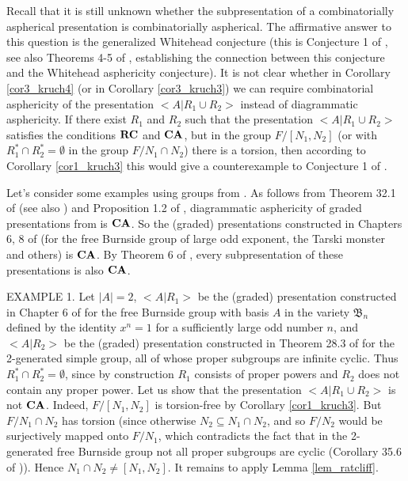 \documentclass[12pt,reqno]{amsart}
\begin{document}
Recall that it is still unknown whether the subpresentation of a combinatorially aspherical presentation is combinatorially aspherical. The affirmative answer to this question is the generalized Whitehead conjecture (this is Conjecture 1 of \cite{ivanov}, see also Theorems 4-5 of \cite{ivanov}, establishing the connection between this conjecture and the Whitehead asphericity conjecture).
   It is not clear whether in Corollary \ref{cor3_kruch4} (or in Corollary \ref{cor3_kruch3}) we can require combinatorial asphericity of the presentation $<A|R_1\cup R_2>$ instead of diagrammatic asphericity.
      If there exist $R_1$ and $R_2$ such that the presentation $<A|R_1\cup R_2>$ satisfies the conditions $\bf RC$ and $\bf CA$, but in the group $F/[N_1, N_2]$ (or with $R_1^*\cap R_2^*=\emptyset$ in the group $F/N_1\cap N_2$) there is a torsion, then according to Corollary \ref{cor1_kruch3} this would give a counterexample to Conjecture 1 of \cite{ivanov}.

   Let's consider some examples using  groups from \cite{olsh}. As follows from Theorem 32.1 of \cite{olsh} (see also \cite{ashmanovOlsh}) and Proposition 1.2 of \cite{chiswell},  diagrammatic asphericity of graded presentations from \cite{olsh} is $\bf CA$. So the (graded) presentations constructed in Chapters 6, 8 of \cite{olsh} (for the free Burnside group of large odd exponent, the Tarski monster and others) is $\bf CA$. By Theorem 6 of \cite{ivanov}, every subpresentation of these presentations is also $\bf CA$.


    EXAMPLE 1. Let $|A|=2$, $<A|R_1>$ be the (graded) presentation constructed in Chapter 6 of \cite{olsh} for the free Burnside group with basis $A$ in the variety $\mathfrak{B}_n$ defined by the identity $x^n=1$ for a sufficiently large odd number $n$, and $<A|R_2>$ be the (graded) presentation constructed in Theorem 28.3 of \cite{olsh} for  the 2-generated simple group, all of whose  proper subgroups are infinite cyclic. Thus $R_1^*\cap R_2^*=\emptyset$, since by construction $R_1$ consists of proper powers and $R_2$ does not contain any proper power. Let us show that the presentation $<A|R_1\cup R_2>$ is not $\bf CA$.  Indeed,  $F/[N_1, N_2]$ is torsion-free by Corollary \ref{cor1_kruch3}. But  $F/N_1\cap N_2$ has torsion (since   otherwise
   $N_2\subseteq N_1\cap N_2$, and so $F/N_2$ would be surjectively mapped onto $F/N_1$, which contradicts the fact that in the 2-generated free Burnside group not all proper subgroups are cyclic (Corollary 35.6 of \cite{olsh})). Hence $N_1\cap N_2\neq[N_1, N_2]$. It remains to apply Lemma \ref{lem_ratcliff}.
\end{document}
